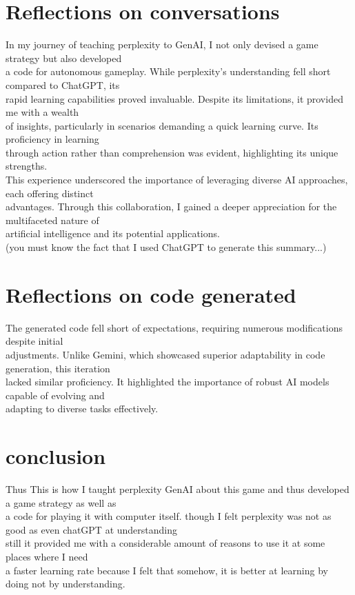 \documentclass[12 pt]{report}
\begin{document}
\section{Reflections on conversations}
In my journey of teaching perplexity to GenAI, I not only devised a game strategy but also developed \\
 a code for autonomous gameplay. While perplexity's understanding fell short compared to ChatGPT, its\\
 rapid learning capabilities proved invaluable. Despite its limitations, it provided me with a wealth\\
   of insights, particularly in scenarios demanding a quick learning curve. Its proficiency in learning\\
    through action rather than comprehension was evident, highlighting its unique strengths. \\
This experience underscored the importance of leveraging diverse AI approaches, each offering distinct\\
 advantages. Through this collaboration, I gained a deeper appreciation for the multifaceted nature of \\
 artificial intelligence and its potential applications. \\
(you must know the fact that I used ChatGPT to generate this summary...)

\section{Reflections on code generated}
The generated code fell short of expectations, requiring numerous modifications despite initial \\
adjustments. Unlike Gemini, which showcased superior adaptability in code generation, this iteration \\
lacked similar proficiency. It highlighted the importance of robust AI models capable of evolving and \\
adapting to diverse tasks effectively.

\section{conclusion}
Thus This is how I taught perplexity GenAI about this game and thus developed a game strategy as well as \\
a code for playing it with computer itself. though I felt perplexity was not as good as even chatGPT at understanding \\
still it provided me with a considerable amount of reasons to use it at some places where I need \\
a faster learning rate because I felt that somehow, it is better at learning by doing not by understanding.\\
\end{document}
